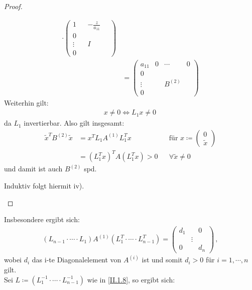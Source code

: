 \begin{proof}
\begin{enumerate}[i)]
\begin{align*}
		\cdot  \begin{pmatrix}
		1 &  &	-\frac{z}{a_{11}} & ~ \\ 
		0 \\
		\vdots && I \\ 
		0
		\end{pmatrix}\\
		&= \begin{pmatrix}
		a_{11} & 0 & \cdots & 0\\ 
		0 \\
		\vdots && B^{(2)} \\ 
		0
		\end{pmatrix} 
		\end{align*}
		Weiterhin gilt:
		\begin{gather*}
		x\neq 0 \Leftrightarrow L_1 x\neq 0 \,
		\end{gather*}
		da $L_1$ invertierbar. Also gilt insgesamt:
		\begin{align*}
		\widetilde{x}^TB^{(2)} \widetilde{x} &= x^T L_1A^{(1)}L_1^Tx
		&&  \text{für } x\coloneqq \begin{pmatrix}	0 \\ \widetilde{x}\end{pmatrix}\\
		&= (L_1^Tx)^TA(L_1^Tx) > 0
		&& \forall \widetilde{x}\neq 0 
		\end{align*}
		und damit ist auch $B^{(2)}$ spd.
		
		Induktiv folgt hiermit iv).
	\end{enumerate}
\end{proof}

Insbesondere ergibt sich: 
\begin{gather*}
(L_{n-1}\cdot \cdots\cdot L_1)A^{(1)}(L_1^T\cdot \cdots \cdot L_{n-1}^T) 
= \begin{pmatrix} d_1 & & 0 \\ &\vdots& \\ 0&& d_n\end{pmatrix} \, ,
\end{gather*}
wobei $d_i$ das i-te Diagonalelement von $A^{(i)}$ ist und somit $d_i>0$ für $ i= 1, \cdots , n$ gilt. \\

Sei $L\coloneqq (L_1^{-1}\cdot \cdots \cdot L_{n-1}^{-1})$ wie in \eqref{II.1.8}, so ergibt sich:



